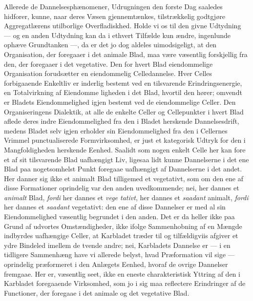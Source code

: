 \documentclass[11pt]{book}
\newcommand{\opage}[1]{\marginnote{\footnotesize\textit{[#1]}}}
\begin{document}
Allerede de Dannelsesphænomener, Udrugningen den forste Dag
saaledes hidforer, kunne, naar deres Væsen gjennemtænkes, tilstrækkelig
godtgjøre Aggregatlærens utilborlige Overfladiskhed. Holde vi os til den
givne Udtydning --- og en anden Udtydning kan da i ethvert Tilfælde
kun ændre, ingenlunde ophæve Grundtanken ---, da er det jo dog
aldeles uimodsigeligt, at den Organisation, der foregaaer i det animale
Blad, maa være væsentlig forskjellig fra den, der foregaaer i det
vegetative. Den for hvert Blad eiendommelige Organisation forudsætter en
eiendommelig Celledannelse. Hver Celles forbigaaende Enkeltliv er
inderlig bestemt ved en tilsvarende Erindringsenergie, en Totalvirkning af
Eiendomme\-%
\opage{347} \setcounter{footnote}{0}%
ligheden i det Blad, hvortil den hører; omvendt er Bladets
Eiendommelighed igjen bestemt ved de eiendommelige Celler. Den
Organiseringens Dialektik, at alle de enkelte Celler og Cellepunkter i hvert
Blad aflede deres indre Eiendommelighed fra den i Bladet herskende
Dannelsesdrift, medens Bladet selv igjen erholder sin Eiendommelighed
fra den i Cellernes Vrimmel punctualiserede Formvirksomhed, er just et
kategorisk Udtryk for den i Mangfoldigheden herskende Eenhed.
Saalidt som nogen enkelt Celle her kan fore et af sit tilsvarende Blad
uafhængigt Liv, ligesaa lidt kunne Dannelserne i det ene Blad paa
nogetsomhelst Punkt foregaae uafhængigt af Dannelserne i det andet.
Her danner sig ikke et animalt Blad tilligemed et vegetativt, som om
den ene af disse Formationer oprindelig var den anden uvedkommende;
nei, her dannes et \emph{animalt} Blad, \emph{fordi} her dannes et
\emph{vege\-%
tativt}, her dannes et \emph{saadant} animalt, \emph{fordi} her dannes et
\emph{saadant} vegetativt: den ene af disse Dannelser er med al sin
Eiendommelighed væsentlig begrundet i den anden. Det er da heller ikke
paa Grund af udvortes Omstændigheder, ikke ifolge Sammenhobning af
en Mængde indbyrdes uafhængige Celler, at Karbladet træder til og
tilfældigviis afgiver et ydre Bindeled imellem de tvende andre; nei,
Karbladets Dannelse er --- i en tidligere Sammenhæng have vi allerede
belyst, hvad Præformation vil sige --- oprindelig præformeret i den
Anlægets Eenhed, hvoraf de ovrige Dannelser fremgaae. Her er,
væsentlig seet, ikke en eneste charakteristisk Yttring af den i Karbladet
foregaaende Virksomhed, som jo i sig maa reflectere Erindringer af de
Functioner, der foregaae i det animale og det vegetative Blad.
\end{document}
